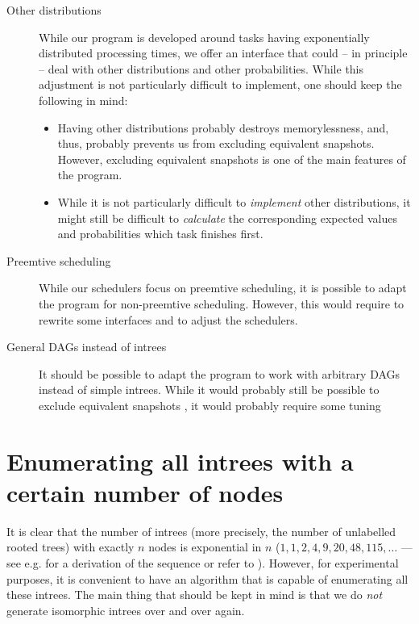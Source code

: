 \begin{description}
\item[Other distributions] While our program is developed around tasks having exponentially distributed processing times, we offer an interface that could -- in principle -- deal with other distributions and other probabilities. While this adjustment is not particularly difficult to implement, one should keep the following in mind:
  \begin{itemize}
  \item Having other distributions probably destroys memorylessness, and, thus, probably prevents us from excluding equivalent snapshots. However, excluding equivalent snapshots is one of the main features of the program.
  \item While it is not particularly difficult to \emph{implement} other distributions, it might still be difficult to \emph{calculate} the corresponding expected values and probabilities which task finishes first.
  \end{itemize}
\item[Preemtive scheduling] While our schedulers focus on preemtive scheduling, it is possible to adapt the program for non-preemtive scheduling. However, this would require to rewrite some interfaces and to adjust the schedulers.
\item[General DAGs instead of intrees] It should be possible to adapt the program to work with arbitrary DAGs instead of simple intrees. While it would probably still be possible to exclude equivalent snapshots , it would probably require some tuning
\end{description}

\section{Enumerating all intrees with a certain number of nodes}
\label{sec:enumerating-all-intrees}

It is clear that the number of intrees (more precisely, the number of unlabelled rooted trees) with exactly $n$ nodes is exponential in $n$ ($1, 1, 2, 4, 9, 20, 48, 115,\dots$ --- see e.g. \cite{flajolet2009analytic} for a derivation of the sequence or refer to \cite{oeisrootedtrees}). However, for experimental purposes, it is convenient to have an algorithm that is capable of enumerating all these intrees. The main thing that should be kept in mind is that we do \emph{not} generate isomorphic intrees over and over again.


